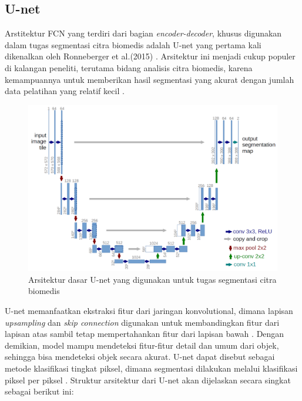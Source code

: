 \subsection{U-net}

\noindent Arstitektur FCN yang terdiri dari bagian \textit{encoder-decoder}, khusus digunakan dalam tugas segmentasi citra biomedis adalah U-net yang pertama kali dikenalkan oleh Ronneberger et al.(2015) \cite{ronneberger_u-net_2015}. Arsitektur ini menjadi cukup populer di kalangan peneliti, terutama bidang analisis citra biomedis, karena kemampuannya untuk memberikan hasil segmentasi yang akurat dengan jumlah data pelatihan yang relatif kecil \cite{williams_unified_2023}.

\begin{figure}[H]
	\centering
	\includegraphics[scale=.2]{gambar/U-net.png}
	\caption{Arsitektur dasar U-net yang digunakan untuk tugas segmentasi citra biomedis \cite{ronneberger_u-net_2015}}
	\label{fig:U-net}
\end{figure}

\noindent U-net memanfaatkan ekstraksi fitur dari jaringan konvolutional, dimana lapisan \textit{upsampling} dan \textit{skip connection} digunakan untuk membandingkan fitur dari lapisan atas sambil tetap mempertahankan fitur dari lapisan bawah \cite{huang_fully_2022}. Dengan demikian, model mampu mendeteksi fitur-fitur detail dan umum dari objek, sehingga bisa mendeteksi objek secara akurat. U-net dapat disebut sebagai metode klasifikasi tingkat piksel, dimana segmentasi dilakukan melalui klasifikasi piksel per piksel \cite{siddique_u-net_2020}. Struktur arsitektur dari U-net akan dijelaskan secara singkat sebagai berikut ini:

